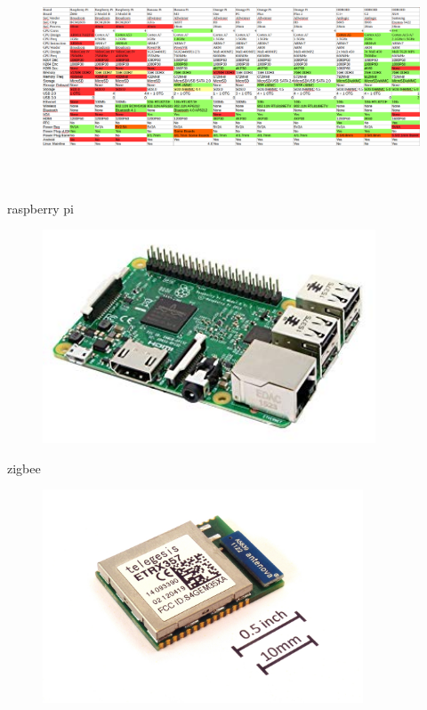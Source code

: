 \begin{figure}[hbt!]
\centering
\includegraphics[height=2.5in]{figures/comparativaOrdenadores.png}
\end{figure}


raspberry pi

\begin{figure}[hbt!]
\centering
\includegraphics[height=2.5in]{figures/raspberrypi3b.jpg}
\end{figure}


zigbee
\begin{figure}[hbt!]
\centering
\includegraphics[height=2.5in]{figures/ETRX357_ZigBee_module_with_size_ref.jpg}
\end{figure}

